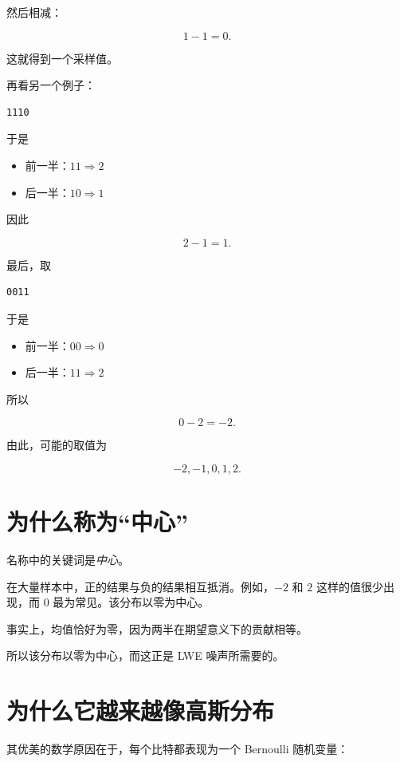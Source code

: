 然后相减：

\[
1-1 = 0.
\]

这就得到一个采样值。

再看另一个例子：

\begin{verbatim}
1110
\end{verbatim}

于是

\begin{itemize}
  \item 前一半：\(11 \Rightarrow 2\)
  \item 后一半：\(10 \Rightarrow 1\)
\end{itemize}

因此

\[
2-1 = 1.
\]

最后，取

\begin{verbatim}
0011
\end{verbatim}

于是

\begin{itemize}
  \item 前一半：\(00 \Rightarrow 0\)
  \item 后一半：\(11 \Rightarrow 2\)
\end{itemize}

所以

\[
0-2 = -2.
\]

由此，可能的取值为

\[
-2,-1,0,1,2.
\]

\section{为什么称为“中心”}

名称中的关键词是\textit{中心}。

在大量样本中，正的结果与负的结果相互抵消。例如，\(-2\) 和 \(2\) 这样的值很少出现，而 \(0\) 最为常见。该分布以零为中心。

事实上，均值恰好为零，因为两半在期望意义下的贡献相等。

所以该分布以零为中心，而这正是 LWE 噪声所需要的。

\section{为什么它越来越像高斯分布}

其优美的数学原因在于，每个比特都表现为一个 Bernoulli 随机变量：

